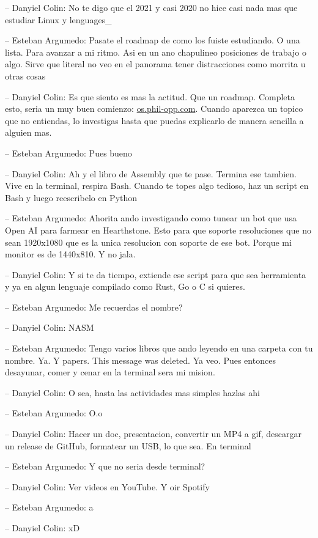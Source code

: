 -- Danyiel Colin: No te digo que el 2021 y casi 2020 no hice casi nada
mas que estudiar Linux y lenguages\_

-- Esteban Argumedo: Pasate el roadmap de como los fuiste estudiando. O
una lista. Para avanzar a mi ritmo. Asi en un ano chapulineo posiciones
de trabajo o algo. Sirve que literal no veo en el panorama tener
distracciones como morrita u otras cosas

-- Danyiel Colin: Es que siento es mas la actitud. Que un roadmap.
Completa esto, seria un muy buen comienzo:
\href{https://os.phil-opp.com/}{os.phil-opp.com}. Cuando aparezca un
topico que no entiendas, lo investigas hasta que puedas explicarlo de
manera sencilla a alguien mas.

-- Esteban Argumedo: Pues bueno

-- Danyiel Colin: Ah y el libro de Assembly que te pase. Termina ese
tambien. Vive en la terminal, respira Bash. Cuando te topes algo
tedioso, haz un script en Bash y luego reescribelo en Python

-- Esteban Argumedo: Ahorita ando investigando como tunear un bot que
usa Open AI para farmear en Hearthstone. Esto para que soporte
resoluciones que no sean 1920x1080 que es la unica resolucion con
soporte de ese bot. Porque mi monitor es de 1440x810. Y no jala.

-- Danyiel Colin: Y si te da tiempo, extiende ese script para que sea
herramienta y ya en algun lenguaje compilado como Rust, Go o C si
quieres.

-- Esteban Argumedo: Me recuerdas el nombre?

-- Danyiel Colin: NASM

-- Esteban Argumedo: Tengo varios libros que ando leyendo en una carpeta
con tu nombre. Ya. Y papers. This message was deleted. Ya veo. Pues
entonces desayunar, comer y cenar en la terminal sera mi mision.

-- Danyiel Colin: O sea, hasta las actividades mas simples hazlas ahi

-- Esteban Argumedo: O.o

-- Danyiel Colin: Hacer un doc, presentacion, convertir un MP4 a gif,
descargar un release de GitHub, formatear un USB, lo que sea. En
terminal

-- Esteban Argumedo: Y que no seria desde terminal?

-- Danyiel Colin: Ver videos en YouTube. Y oir Spotify

-- Esteban Argumedo: a

-- Danyiel Colin: xD

